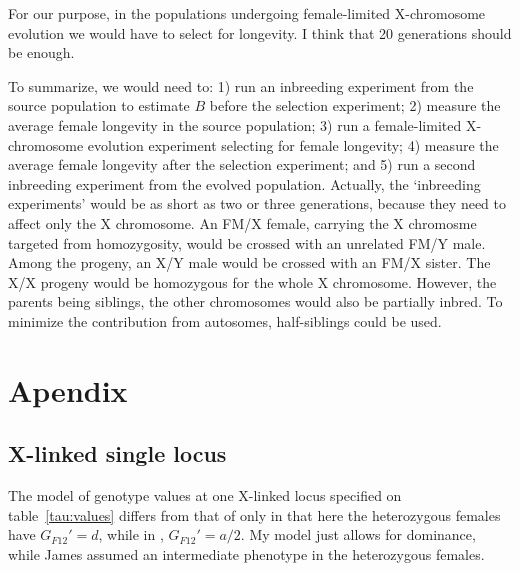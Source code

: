 \documentclass[a4paper,12pt]{article}
\begin{document}
For our purpose, in the populations undergoing female-limited X-chromosome evolution we would have to select for longevity. I think that 20 generations should be enough. 

To summarize, we would need to: 1) run an inbreeding experiment from the source population to estimate $B$ before the selection experiment; 2) measure the average female longevity in the source population; 3) run a female-limited X-chromosome evolution experiment selecting for female longevity; 4) measure the average female longevity after the selection experiment; and 5) run a second inbreeding experiment from the evolved population. Actually, the `inbreeding experiments' would be as short as two or three generations, because they need to affect only the X chromosome. An FM/X female, carrying the X chromosme targeted from homozygosity, would be crossed with an unrelated FM/Y male. Among the progeny, an X/Y male would be crossed with an FM/X sister. The X/X progeny would be homozygous for the whole X chromosome. However, the parents being siblings, the other chromosomes would also be partially inbred. To minimize the contribution from autosomes, half-siblings could be used.


\section{Apendix}
\subsection{X-linked single locus}\label{A1}
The model of genotype values at one X-linked locus specified on table~\ref{tau:values} differs from that of \citet{James1973} only in that here the heterozygous females have $G_{F12}'=d$, while in \citet{James1973}, $G_{F12}' = a/2$. My model just allows for dominance, while James assumed an intermediate phenotype in the heterozygous females.
\end{document}

